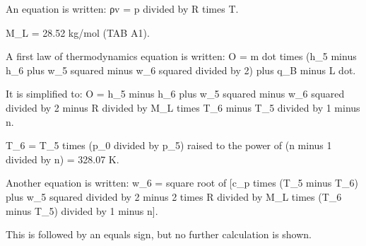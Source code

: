 An equation is written:  
ρv = p divided by R times T.  

M_L = 28.52 kg/mol (TAB A1).  

A first law of thermodynamics equation is written:  
O = m dot times (h_5 minus h_6 plus w_5 squared minus w_6 squared divided by 2) plus q_B minus L dot.  

It is simplified to:  
O = h_5 minus h_6 plus w_5 squared minus w_6 squared divided by 2 minus R divided by M_L times T_6 minus T_5 divided by 1 minus n.  

T_6 = T_5 times (p_0 divided by p_5) raised to the power of (n minus 1 divided by n) = 328.07 K.  

Another equation is written:  
w_6 = square root of [c_p times (T_5 minus T_6) plus w_5 squared divided by 2 minus 2 times R divided by M_L times (T_6 minus T_5) divided by 1 minus n].  

This is followed by an equals sign, but no further calculation is shown.